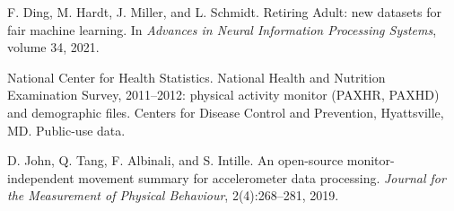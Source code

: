 F. Ding, M. Hardt, J. Miller, and L. Schmidt.
\newblock Retiring Adult: new datasets for fair machine learning.
\newblock In \emph{Advances in Neural Information Processing Systems}, volume 34, 2021.

National Center for Health Statistics.
\newblock National Health and Nutrition Examination Survey, 2011--2012: physical activity monitor (PAXHR, PAXHD) and demographic files.
\newblock Centers for Disease Control and Prevention, Hyattsville, MD. Public-use data.

D. John, Q. Tang, F. Albinali, and S. Intille.
\newblock An open-source monitor-independent movement summary for accelerometer data processing.
\newblock \emph{Journal for the Measurement of Physical Behaviour}, 2(4):268--281, 2019.

